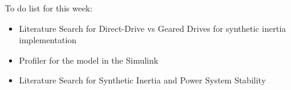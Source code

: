 \documentclass[12pt]{article}
\begin{document}
To do list for this week: 

\begin{itemize}

	\item Literature Search for Direct-Drive vs Geared Drives for synthetic inertia implementation 
	
	\item Profiler for the model in the Simulink 
	
	\item Literature Search for Synthetic Inertia and Power System Stability

\end{itemize}
\end{document}

